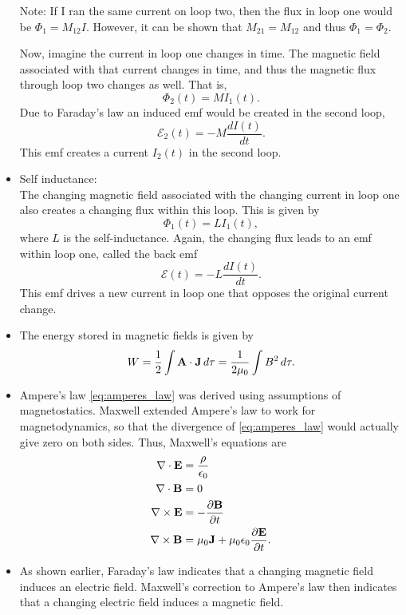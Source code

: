\documentclass[a4paper,11pt]{report}
\begin{document}
\begin{itemize}
Note: If I ran the same current on loop two, then the flux in loop one would be $\Phi_1 = M_{12} I$. However, it can be shown that $M_{21} = M_{12}$ and thus $\Phi_1 = \Phi_2$.

Now, imagine the current in loop one changes in time. The magnetic field associated with that current changes in time, and thus the magnetic flux through loop two changes as well. That is,
\begin{equation}
\Phi_2(t) = M I_1(t).
\end{equation}
Due to Faraday's law an induced emf would be created in the second loop, \begin{equation}
\mathcal{E}_2(t) = - M \frac{d I(t)}{dt}.
\end{equation}
This emf creates a current $I_2(t)$ in the second loop.

\item Self inductance:\\
The changing magnetic field associated with the changing current in loop one also creates a changing flux within this loop. This is given by
\begin{equation}
\Phi_1(t) = L I_1(t),
\end{equation}
where $L$ is the self-inductance. Again, the changing flux leads to an emf within loop one, called the back emf
\begin{equation}
\mathcal{E}(t) = - L \frac{d I(t)}{dt}.
\end{equation}
This emf drives a new current in loop one that opposes the original current change.

\item The energy stored in magnetic fields is given by
\begin{equation}
W = \frac{1}{2} \int \mathbf{A} \cdot \mathbf{J} \, d\tau = \frac{1}{2\mu_0} \int B^2 \, d\tau.
\end{equation}

\item Ampere's law \cref{eq:amperes_law} was derived using assumptions of magnetostatics. Maxwell extended Ampere's law to work for magnetodynamics, so that the divergence of \cref{eq:amperes_law} would actually give zero on both sides. Thus, Maxwell's equations are
\begin{align}
\nabla \cdot \mathbf{E} &= \frac{\rho}{\epsilon_0} \\
\nabla \cdot \mathbf{B} &= 0 \\
\nabla \times \mathbf{E} &= -\frac{ \partial \mathbf{B}}{\partial t} \\
\nabla \times \mathbf{B} &= \mu_0 \mathbf{J} + \mu_0 \epsilon_0 \frac{\partial \mathbf{E}}{ \partial t}.
\end{align}

\item As shown earlier, Faraday's law indicates that a changing magnetic field induces an electric field. Maxwell's correction to Ampere's law then indicates that a changing electric field induces a magnetic field. 

\end{itemize}
\end{document}
